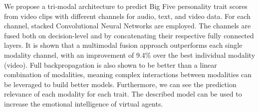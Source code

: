 We propose a tri-modal architecture to predict Big Five personality trait scores from video clips with different channels for audio, text, and video data. For each channel, stacked Convolutional Neural Networks are employed. The channels are fused both on decision-level and by concatenating their respective fully connected layers. It is shown that a multimodal fusion approach outperforms each single modality channel, with an improvement of 9.4\% over the best individual modality (video). Full backpropagation is also shown to be better than a linear combination of modalities, meaning complex interactions between modalities can be leveraged to build better models. Furthermore, we can see the prediction relevance of each modality for each trait. The described model can be used to increase the emotional intelligence of virtual agents.
